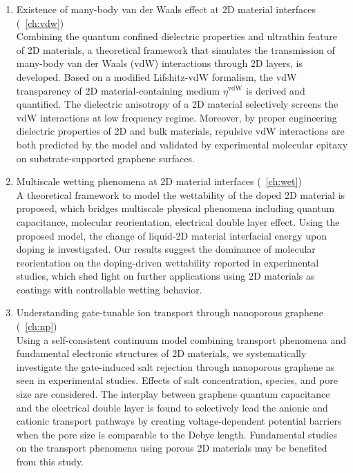 \begin{enumerate}
  
\item Existence of many-body van der Waals effect at 2D material
  interfaces (~\autoref{ch:vdw})\\
  Combining the quantum confined dielectric properties and ultra\-thin
  feature of 2D materials, a theoretical framework that simulates the
  transmission of many-body van der Waals (vdW) interactions through
  2D layers, is developed. Based on a modified Lifshitz-vdW formalism,
  the vdW transparency of 2D material-containing medium
  $\eta^{\mathrm{vdW}}$ is derived and quantified.  The
  dielectric anisotropy of a 2D material selectively screens the vdW
  interactions at low frequency regime. Moreover, by proper
  engineering dielectric properties of 2D and bulk materials,
  repulsive vdW interactions are both predicted by the model and validated
  by experimental molecular epitaxy on substrate-supported graphene surfaces.

  
\item Multiscale wetting phenomena at 2D material interfaces (~\autoref{ch:wet})\\
  A theoretical framework to model the wettability of the doped 2D
  material is proposed, which bridges multiscale physical phenomena
  including quantum capacitance, molecular reorientation, electrical
  double layer effect. Using the proposed model, the change of
  liquid-2D material interfacial energy upon doping is
  investigated. Our results suggest the dominance of molecular
  reorientation on the doping-driven wettability reported in
  experimental studies, which shed light on further applications using
  2D materials as coatings with controllable wetting behavior.

  
\item Understanding gate-tunable ion transport through nanoporous graphene (~\autoref{ch:np})\\
  Using a self-consistent continuum model combining transport
  phenomena and fundamental electronic structures of 2D materials, we
  systematically investigate the gate-induced salt rejection through
  nanoporous graphene as seen in experimental studies.  Effects of
  salt concentration, species, and pore size are considered. The
  interplay between graphene quantum capacitance and the electrical
  double layer is found to selectively lead the anionic and cationic
  transport pathways by creating voltage-dependent potential barriers
  when the pore size is comparable to the Debye length. Fundamental
  studies on the transport phenomena using porous 2D materials may be
  benefited from this study.


\end{enumerate}
